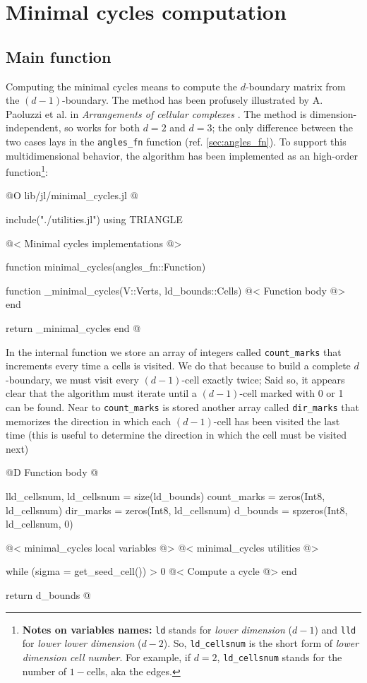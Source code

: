 \chapter{Minimal cycles computation}
\label{ch:minimal_cycles}

\section{Main function}


Computing the minimal cycles means to compute the $d$-boundary matrix
from the $(d-1)$-boundary. The method has been profusely illustrated
by A. Paoluzzi et al. in \textit{Arrangements of cellular complexes}
\cite{Paoluzzi}.
The method is dimension-independent, so works for both $d=2$ and $d=3$;
the only difference between the two cases lays in the \texttt{angles\_fn}
function (ref. \ref{sec:angles_fn}). To support this multidimensional
behavior, the algorithm has been implemented as an high-order function\footnote{
    \textbf{Notes on variables names:} \texttt{ld} stands for \textit{lower dimension} ($d-1$)
    and \texttt{lld} for \textit{lower lower dimension} ($d-2$). So, \texttt{ld\_cellsnum} is the
    short form of \textit{lower dimension cell number}. For example, if $d=2$, \texttt{ld\_cellsnum} stands for the
    number of $1-$cells, aka the edges.
}:

@O lib/jl/minimal_cycles.jl
@{include("./utilities.jl")
using TRIANGLE

@< Minimal cycles implementations @>

function minimal_cycles(angles_fn::Function)

    function _minimal_cycles(V::Verts, ld_bounds::Cells)
        @< Function body @>
    end

    return _minimal_cycles
end
@}

In the internal function we store an array of integers called \texttt{count\_marks} 
that increments every time a cells is visited. We do that because to build 
a complete $d$-boundary, we must visit every $(d-1)$-cell exactly twice;
Said so, it appears clear that the algorithm must iterate until a $(d-1)$-cell 
marked with 0 or 1 can be found. Near to \texttt{count\_marks} is stored another
array called \texttt{dir\_marks} that memorizes the direction in which each $(d-1)$-cell
has been visited the last time (this is useful to determine the direction in which the cell
must be visited next)

@D Function body
@{lld_cellsnum, ld_cellsnum = size(ld_bounds)
count_marks = zeros(Int8, ld_cellsnum)
dir_marks = zeros(Int8, ld_cellsnum)
d_bounds = spzeros(Int8, ld_cellsnum, 0)

@< minimal\_cycles local variables @>
@< minimal\_cycles utilities @>

while (sigma = get_seed_cell()) > 0
    @< Compute a cycle @>
end

return d_bounds
@}

